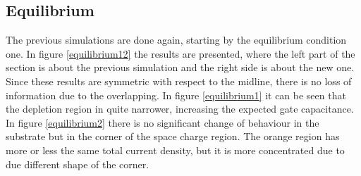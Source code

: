 \documentclass[11pt,a4paper]{article}
\begin{document}
	\subsection{Equilibrium}
		The previous simulations are done again, starting by the equilibrium condition one. In figure \ref*{equilibrium12} the results are presented, where the left part of the section is about the previous simulation and the right side is about the new one. Since these results are symmetric with respect to the midline, there is no loss of information due to the overlapping. In figure \ref*{equilibrium1} it can be seen that the depletion region in quite narrower, increasing the expected gate capacitance. In figure \ref*{equilibrium2} there is no significant change of behaviour in the substrate but in the corner of the space charge region. The orange region has more or less the same total current density, but it is more concentrated due to due different shape of the corner.
\end{document}
